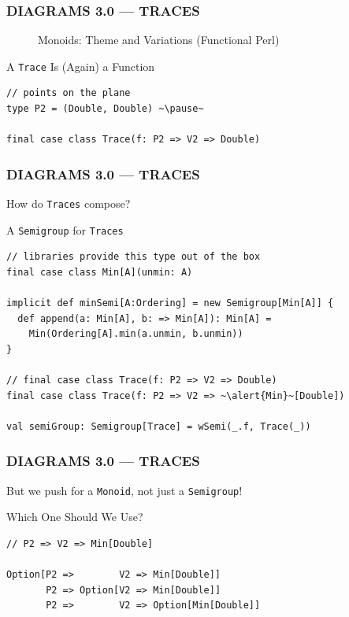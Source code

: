 \documentclass{beamer}
\begin{document}
\begin{frame}[fragile] \frametitle{DIAGRAMS 3.0 --- TRACES}
  \begin{figure}
      \centering
      \caption{Monoids: Theme and Variations (Functional Perl)}
  \end{figure}

  \begin{block}{A \texttt{Trace} Is (Again) a Function}
  \begin{lstlisting}
// points on the plane
type P2 = (Double, Double) ~\pause~

final case class Trace(f: P2 => V2 => Double)
  \end{lstlisting}
  \vspace{-0.4cm}
  \end{block}
\end{frame}

\begin{frame}[fragile] \frametitle{DIAGRAMS 3.0 --- TRACES}
  How do \texttt{Traces} compose?

  \begin{block}{A \texttt{Semigroup} for \texttt{Traces}}
  \begin{lstlisting}
// libraries provide this type out of the box
final case class Min[A](unmin: A)

implicit def minSemi[A:Ordering] = new Semigroup[Min[A]] {
  def append(a: Min[A], b: => Min[A]): Min[A] =
    Min(Ordering[A].min(a.unmin, b.unmin))
}

// final case class Trace(f: P2 => V2 => Double)
final case class Trace(f: P2 => V2 => ~\alert{Min}~[Double])

val semiGroup: Semigroup[Trace] = wSemi(_.f, Trace(_))
  \end{lstlisting}
  \end{block}
\end{frame}

\begin{frame}[fragile] \frametitle{DIAGRAMS 3.0 --- TRACES}
  But we push for a \texttt{Monoid}, not just a \texttt{Semigroup}!

  \begin{block}{Which One Should We Use?}
  \begin{lstlisting}
// P2 => V2 => Min[Double]

Option[P2 =>        V2 => Min[Double]]
       P2 => Option[V2 => Min[Double]]
       P2 =>        V2 => Option[Min[Double]]
  \end{lstlisting}
  \end{block}
\end{frame}
\end{document}
